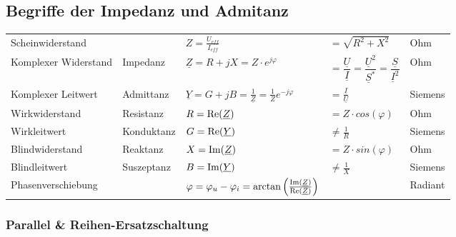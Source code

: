 	\subsection{Begriffe der Impedanz und Admitanz}
		\begin{tabular}{lllll}
		Scheinwiderstand & & $Z = \frac{U_{eff}}{I_{eff}} $ & $ =
		\sqrt{R^2+X^2}$ & Ohm\\ Komplexer Widerstand & Impedanz & $\underline Z = R + jX = Z \cdot e^{j \varphi}$ 
		& $  = \dfrac{\underline{U}}{\underline{I}} = \dfrac{\underline{U}^2}{\underline{S}^*} = 
		\dfrac{\underline{S}}{\underline{I}^2}$ & Ohm\\
		Komplexer Leitwert & Admittanz & $\underline Y = G + jB =
		\frac{1}{\underline Z} = \frac{1}{Z}e^{-j\varphi}$ & $= \frac{\underline{I}}{\underline{U}}$ &  Siemens\\
		Wirkwiderstand & Resistanz & $R = \operatorname{Re}(\underline Z) $ & $ = Z
		\cdot cos(\varphi)$ & Ohm\\
		Wirkleitwert & Konduktanz & $G = \operatorname{Re}(\underline Y) $ & $ \neq \frac{1}{R}$ &
		Siemens\\
		Blindwiderstand & Reaktanz & $X = \operatorname{Im}(\underline Z) $ & $ = Z
		\cdot sin(\varphi)$ & Ohm\\
		Blindleitwert & Suszeptanz & $B = \operatorname{Im}( \underline Y) $ & $ \neq \frac{1}{X}$
		& Siemens\\
		Phasenverschiebung & & $\varphi = \varphi_u - \varphi_i =
		\arctan\left(\frac{\operatorname{Im}(\underline{Z})}{\operatorname{Re}(\underline{Z})}\right)$ & &
		Radiant\\
		
		\end{tabular}
	
	\subsubsection{Parallel \& Reihen-Ersatzschaltung}
		
